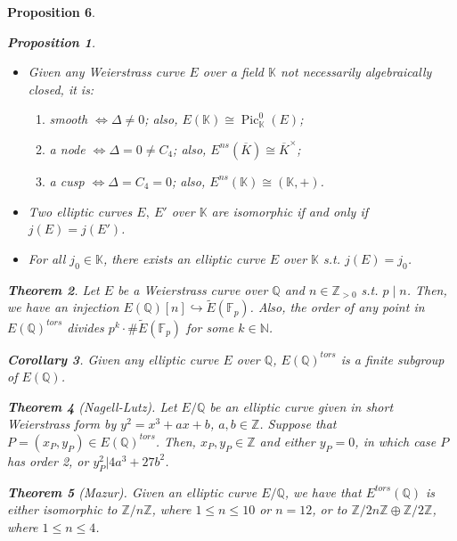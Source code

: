 \documentclass{article}
\newcommand{\numberset}{\mathbb}
\newcommand{\N}{\numberset{N}}
\newcommand{\Z}{\numberset{Z}}
\newcommand{\Q}{\numberset{Q}}
\newcommand{\K}{\numberset{K}}
\newcommand{\F}{\numberset{F}}
\DeclareMathOperator{\Pic}{Pic}
\theoremstyle{plain}
\newtheorem{thm}{Theorem}
\newtheorem{prop}[thm]{Proposition}
\newtheorem{cor}[thm]{Corollary}
\theoremstyle{definition}
\begin{document}
\begin{prop}
\begin{prop}
    \begin{itemize}
        \item Given any Weierstrass curve $E$ over a field $\K$ not necessarily
            algebraically closed, it is:\begin{enumerate}
                \item smooth $\Leftrightarrow\Delta\neq 0$; also,
                    $E(\K)\cong\Pic^0_\K(E)$;
                \item a node $\Leftrightarrow\Delta=0\neq C_4$; also,
                    $E^{ns}(\overline{K})\cong\overline{K}^\times$;
                \item a cusp $\Leftrightarrow\Delta=C_4=0$; also,
                    $E^{ns}(\K)\cong(\K,+)$.
            \end{enumerate}
        \item Two elliptic curves $E,\ E'$ over $\K$ are isomorphic if and only
            if $j(E)=j(E')$.
        \item For all $j_0\in\K$, there exists an elliptic curve $E$ over $\K$
            s.t. $j(E)=j_0$.
    \end{itemize}
\end{prop}

\begin{thm}
    Let $E$ be a Weierstrass curve over $\Q$ and $n\in\Z_{>0}$ s.t. $p\mid n$.
    Then, we have an injection $E(\Q)[n]\hookrightarrow\tilde{E}(\F_p)$. Also,
    the order of any point in $E(\Q)^{tors}$ divides
    $p^k\cdot \#\tilde{E}(\F_p)$ for some $k\in\N$.
\end{thm}

\begin{cor}
    Given any elliptic curve $E$ over $\Q$, $E(\Q)^{tors}$ is a finite subgroup
    of $E(\Q)$.
\end{cor}

\begin{thm}[Nagell-Lutz]
    Let $E/\Q$ be an elliptic curve given in short Weierstrass form by
    $y^2=x^3+ax+b$, $a,b\in\Z$. Suppose that $P=(x_P,y_P)\in E(\Q)^{tors}$.
    Then, $x_P,y_P\in\Z$ and either $y_P=0$, in which case $P$ has order 2, or
    $y_P^2|4a^3+27b^2$.
\end{thm}

\begin{thm}[Mazur]
    Given an elliptic curve $E/\Q$, we have that $E^{tors}(\Q)$ is either
    isomorphic to $\Z/n\Z$, where $1\leq n\leq 10$ or $n=12$, or to
    $\Z/2n\Z\oplus\Z/2\Z$, where $1\leq n\leq 4$.
\end{thm}


\end{prop}
\end{document}
